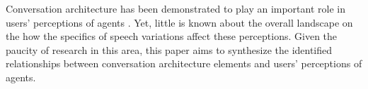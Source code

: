 Conversation architecture has been demonstrated to play an important role in users' perceptions of agents \cite{knijnenburg2016inferring, moussawi2021perceptions, seeger2021chatbots}\cmt{[35]}. Yet, little is known about the overall landscape on the how the specifics of speech variations affect these perceptions. Given the paucity of research in this area, this paper aims to synthesize the identified relationships between conversation architecture elements and users' perceptions of agents.


